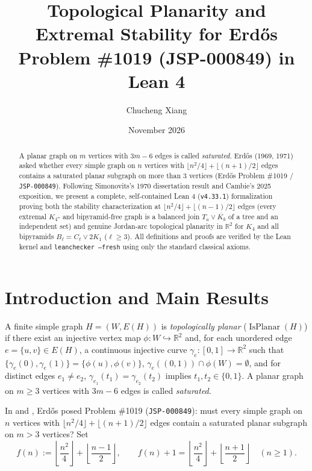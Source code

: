 \documentclass[11pt]{amsart}
\title[Formalization of Erd\H{o}s Problem \#1019 (JSP-000849)]{Topological Planarity and Extremal Stability for Erd\H{o}s Problem \#1019 (JSP-000849) in Lean 4}
\author{Chucheng Xiang}
\date{November 2026}
\begin{document}
\begin{abstract}
A planar graph on $m$ vertices with $3m - 6$ edges is called \emph{saturated}. Erd\H{o}s (1969, 1971) asked whether every simple graph on $n$ vertices with $\lfloor n^2/4 \rfloor + \lfloor (n+1)/2 \rfloor$ edges contains a saturated planar subgraph on more than $3$ vertices (Erd\H{o}s Problem \#1019 / \texttt{JSP-000849}). Following Simonovits's 1970 dissertation result and Cambie's 2025 exposition, we present a complete, self-contained Lean 4 (\texttt{v4.33.1}) formalization proving both the stability characterization at $\lfloor n^2/4 \rfloor + \lfloor (n-1)/2 \rfloor$ edges (every extremal $K_4$- and bipyramid-free graph is a balanced join $T_a \vee \overline{K_b}$ of a tree and an independent set) and genuine Jordan-arc topological planarity in $\mathbb{R}^2$ for $K_4$ and all bipyramids $B_\ell = C_\ell \vee 2K_1$ ($\ell \ge 3$). All definitions and proofs are verified by the Lean kernel and \texttt{leanchecker --fresh} using only the standard classical axioms.
\end{abstract}

\maketitle

\section{Introduction and Main Results}

A finite simple graph $H = (W, E(H))$ is \emph{topologically planar} ($\operatorname{IsPlanar}(H)$) if there exist an injective vertex map $\phi : W \hookrightarrow \mathbb{R}^2$ and, for each unordered edge $e = \{u, v\} \in E(H)$, a continuous injective curve $\gamma_e : [0, 1] \to \mathbb{R}^2$ such that $\{\gamma_e(0), \gamma_e(1)\} = \{\phi(u), \phi(v)\}$, $\gamma_e((0,1)) \cap \phi(W) = \emptyset$, and for distinct edges $e_1 \ne e_2$, $\gamma_{e_1}(t_1) = \gamma_{e_2}(t_2)$ implies $t_1, t_2 \in \{0,1\}$. A planar graph on $m \ge 3$ vertices with $3m - 6$ edges is called \emph{saturated}.

In \cite[pp.~16--17]{Er69c} and \cite[item~13, p.~102]{Er71}, Erd\H{o}s posed Problem \#1019 (\texttt{JSP-000849}): must every simple graph on $n$ vertices with $\lfloor n^2/4 \rfloor + \lfloor (n+1)/2 \rfloor$ edges contain a saturated planar subgraph on $m > 3$ vertices? Set
\[
  f(n) := \left\lfloor \frac{n^2}{4} \right\rfloor + \left\lfloor \frac{n-1}{2} \right\rfloor, \qquad
  f(n) + 1 = \left\lfloor \frac{n^2}{4} \right\rfloor + \left\lfloor \frac{n+1}{2} \right\rfloor \quad (n \ge 1).
\]
\end{document}
